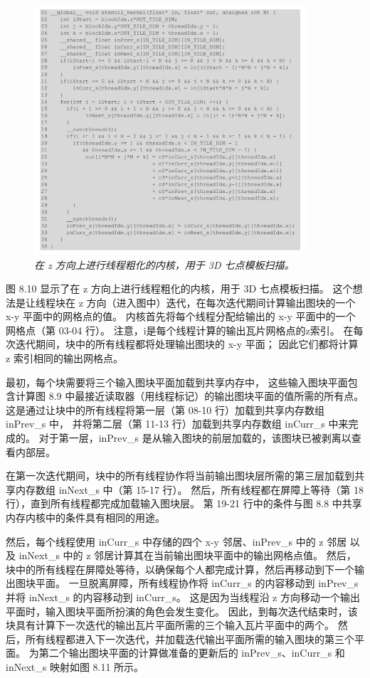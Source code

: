 \begin{figure}[H]
	\centering
	\includegraphics[width=0.9\textwidth]{figs/F8.10.png}
	\caption{\textit{在 z 方向上进行线程粗化的内核，用于 3D 七点模板扫描。}}
\end{figure}

图 8.10 显示了在 z 方向上进行线程粗化的内核，用于 3D 七点模板扫描。 
这个想法是让线程块在 z 方向（进入图中）迭代，在每次迭代期间计算输出图块的一个 x-y 平面中的网格点的值。 
内核首先将每个线程分配给输出的 x-y 平面中的一个网格点（第 03-04 行）。 注意，i是每个线程计算的输出瓦片网格点的z索引。 
在每次迭代期间，块中的所有线程都将处理输出图块的 x-y 平面； 因此它们都将计算 z 索引相同的输出网格点。

最初，每个块需要将三个输入图块平面加载到共享内存中，
这些输入图块平面包含计算图 8.9 中最接近读取器（用线程标记）的输出图块平面的值所需的所有点。 
这是通过让块中的所有线程将第一层（第 08-10 行）加载到共享内存数组 inPrev\_s 中，
并将第二层（第 11-13 行）加载到共享内存数组 inCurr\_s 中来完成的。 
对于第一层，inPrev\_s 是从输入图块的前层加载的，该图块已被剥离以查看内部层。

在第一次迭代期间，块中的所有线程协作将当前输出图块层所需的第三层加载到共享内存数组 inNext\_s 中（第 15-17 行）。 
然后，所有线程都在屏障上等待（第 18 行），直到所有线程都完成加载输入图块层。 
第 19-21 行中的条件与图 8.8 中共享内存内核中的条件具有相同的用途。

然后，每个线程使用 inCurr\_s 中存储的四个 x-y 邻居、inPrev\_s 中的 z 邻居
以及 inNext\_s 中的 z 邻居计算其在当前输出图块平面中的输出网格点值。 
然后，块中的所有线程在屏障处等待，以确保每个人都完成计算，然后再移动到下一个输出图块平面。 
一旦脱离屏障，所有线程协作将 inCurr\_s 的内容移动到 inPrev\_s 并将 inNext\_s 的内容移动到 inCurr\_s。 
这是因为当线程沿 z 方向移动一个输出平面时，输入图块平面所扮演的角色会发生变化。 
因此，到每次迭代结束时，该块具有计算下一次迭代的输出瓦片平面所需的三个输入瓦片平面中的两个。 
然后，所有线程都进入下一次迭代，并加载迭代输出平面所需的输入图块的第三个平面。 
为第二个输出图块平面的计算做准备的更新后的 inPrev\_s、inCurr\_s 和 inNext\_s 映射如图 8.11 所示。

